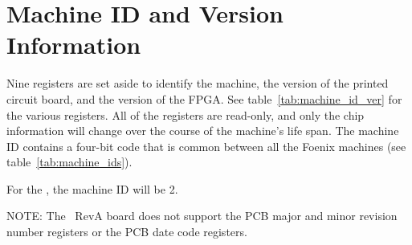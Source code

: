\section*{Machine ID and Version Information}

Nine registers are set aside to identify the machine, the version of the printed circuit board, and the version of the FPGA. See table~\ref{tab:machine_id_ver} for the various registers. All of the registers are read-only, and only the chip information will change over the course of the machine's life span. The machine ID contains a four-bit code that is common between all the Foenix machines (see table~\ref{tab:machine_ids}).

For the \jr, the machine ID will be 2.

\begin{leftbar}
	NOTE: The \jr\ RevA board does not support the PCB major and minor revision number registers or the PCB date code registers.
\end{leftbar}


